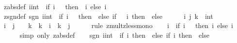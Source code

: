 \begin{isabellebody}
\isanewline
\isanewline
{}\isamarkupfalse%
\ zabs{\isacharunderscore}{\kern0pt}def{\isacharcolon}{\kern0pt}\ {\isachardoublequoteopen}{\isasymbar}i{\isacharcolon}{\kern0pt}{\isacharcolon}{\kern0pt}int{\isasymbar}\ {\isacharequal}{\kern0pt}\ {\isacharparenleft}{\kern0pt}if\ i\ {\isacharless}{\kern0pt}\ {}\ then\ {\isacharminus}{\kern0pt}\ i\ else\ i{\isacharparenright}{\kern0pt}{\isachardoublequoteclose}\isanewline
\isanewline
{}\isamarkupfalse%
\ zsgn{\isacharunderscore}{\kern0pt}def{\isacharcolon}{\kern0pt}\ {\isachardoublequoteopen}sgn\ {\isacharparenleft}{\kern0pt}i{\isacharcolon}{\kern0pt}{\isacharcolon}{\kern0pt}int{\isacharparenright}{\kern0pt}\ {\isacharequal}{\kern0pt}\ {\isacharparenleft}{\kern0pt}if\ i\ {\isacharequal}{\kern0pt}\ {}\ then\ {}\ else\ if\ {}\ {\isacharless}{\kern0pt}\ i\ then\ {}\ else\ {\isacharminus}{\kern0pt}\ {}{\isacharparenright}{\kern0pt}{\isachardoublequoteclose}\isanewline
\isanewline
{}\isamarkupfalse%
\isanewline
%
\isadelimproof
%
\endisadelimproof
%
\isatagproof
{}\isamarkupfalse%
\isanewline
\ \ \isamarkupfalse%
\ i\ j\ k\ {\isacharcolon}{\kern0pt}{\isacharcolon}{\kern0pt}\ int\isanewline
\ \ \isamarkupfalse%
\ {\isachardoublequoteopen}i\ {\isacharless}{\kern0pt}\ j\ {\isasymLongrightarrow}\ {}\ {\isacharless}{\kern0pt}\ k\ {\isasymLongrightarrow}\ k\ {\isacharasterisk}{\kern0pt}\ i\ {\isacharless}{\kern0pt}\ k\ {\isacharasterisk}{\kern0pt}\ j{\isachardoublequoteclose}\isanewline
\ \ \ \ \isamarkupfalse%
\ {\isacharparenleft}{\kern0pt}rule\ zmult{\isacharunderscore}{\kern0pt}zless{\isacharunderscore}{\kern0pt}mono{}{\isacharparenright}{\kern0pt}\isanewline
\ \ \isamarkupfalse%
\ {\isachardoublequoteopen}{\isasymbar}i{\isasymbar}\ {\isacharequal}{\kern0pt}\ {\isacharparenleft}{\kern0pt}if\ i\ {\isacharless}{\kern0pt}\ {}\ then\ {\isacharminus}{\kern0pt}i\ else\ i{\isacharparenright}{\kern0pt}{\isachardoublequoteclose}\isanewline
\ \ \ \ \isamarkupfalse%
\ {\isacharparenleft}{\kern0pt}simp\ only{\isacharcolon}{\kern0pt}\ zabs{\isacharunderscore}{\kern0pt}def{\isacharparenright}{\kern0pt}\isanewline
\ \ \isamarkupfalse%
\ {\isachardoublequoteopen}sgn\ {\isacharparenleft}{\kern0pt}i{\isacharcolon}{\kern0pt}{\isacharcolon}{\kern0pt}int{\isacharparenright}{\kern0pt}\ {\isacharequal}{\kern0pt}\ {\isacharparenleft}{\kern0pt}if\ i{\isacharequal}{\kern0pt}{}\ then\ {}\ else\ if\ {}{\isacharless}{\kern0pt}i\ then\ {}\ else\ {\isacharminus}{\kern0pt}\ {}{\isacharparenright}{\kern0pt}{\isachardoublequoteclose}\isanewline

\end{isabellebody}
